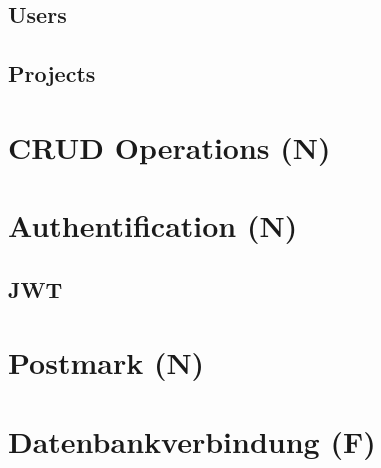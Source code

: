 \subsection{Users}


\subsection{Projects}


\section{CRUD Operations (N)}


\section{Authentification (N)}


\subsection{JWT}


\section{Postmark (N)}

\newpage
\section{Datenbankverbindung (F)}
